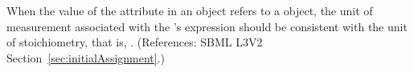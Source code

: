 When the value of the attribute  in an \InitialAssignment
object refers to a \SpeciesReference object, the unit of measurement
associated with the \InitialAssignment's  expression should be
consistent with the unit of stoichiometry, that is, .
(References: SBML L3V2 Section~\ref{sec:initialAssignment}.)
